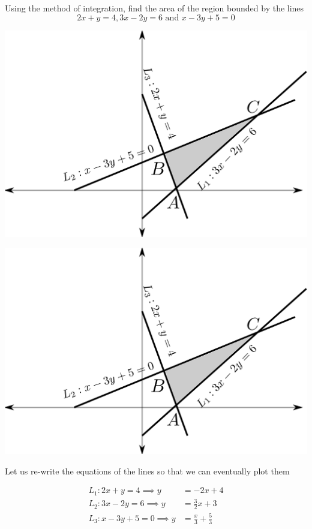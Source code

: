 \documentclass[14pt,fleqn]{extarticle}
\newcommand\lone{2x+y=4}
\newcommand\ltwo{3x-2y = 6}
\newcommand\lthree{x-3y+5=0}
\begin{document}
Using the method of integration, find the 
area of the region bounded by the lines 
\[\lone, \ltwo  \text{ and }  \lthree \]
%

\newcard 

\begin{center}
\includegraphics[scale=0.55]{img_right.svg} 
\end{center} 

\newcard

\begin{center}
\includegraphics[scale=0.55]{img_right.svg} 
\end{center} 

\newcard

Let us re-write the equations of the lines so that we can eventually plot them 

\begin{align}
	L_1: \lone \implies y &= -2x + 4 \\ 
	L_2 : \ltwo \implies y &= \frac{3}{2}x + 3 \\ 
	L_3: \lthree \implies y &= \frac{x}{3} + \frac{5}{3}
\end{align}
\end{document}
